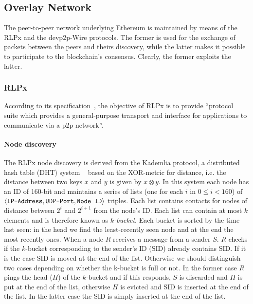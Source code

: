 \subsection{Overlay Network}
The peer-to-peer network underlying Ethereum is maintained by means of the 
RLPx and the devp2p-Wire protocols.
The former is used for the exchange of packets between the peers and theirs
discovery, while the latter makes it possible to participate to the 
blockchain's consensus. Clearly, the former exploits the latter.

\subsubsection{RLPx}
According to its specification~\cite{}, the objective of RLPx is to
provide ``protocol suite which
provides a general-purpose transport and interface for applications to
communicate via a p2p network''.

\paragraph{Node discovery}
The RLPx node discovery is derived from the Kademlia protocol,
a distributed hash table (DHT) system ~\cite{bib:kademlia} 
based on the XOR-metric for 
distance, i.e. the distance between two keys $x$ and $y$ is given 
by $x \otimes y$.
In this system each node has an ID of 160-bit and maintains a
series of lists (one for each $i$ in $0 \leq i < 160$) of 
$\langle \verb|IP-Address|, \verb|UDP-Port|, \verb|Node ID| \rangle$ triples.
Each list contains contacts for nodes of distance between $2^i$ and $2^{i+1}$ 
from the node's ID.
Each list can contain at most $k$ elements and is therefore known as 
\textit{$k$-bucket}.
Each bucket is sorted by the time last
seen: in the head we find the least-recently seen node and at the end the most
recently ones.
When a node $R$ receives a message from a sender $S$. $R$ checks if the
$k$-bucket corresponding to the sender's ID (SID) already contains SID.
If it is the case SID is moved at the end of the list. Otherwise we should
distinguish two cases depending on whether the k-bucket is full or not.
In the former case $R$ pings the head ($H$) of the $k$-bucket and if
this responds, $S$ is discarded and $H$ is put at the end of the list,
otherwise $H$ is evicted and SID is inserted at the end of the list.
In the latter case the SID is simply inserted at the end of the list.

